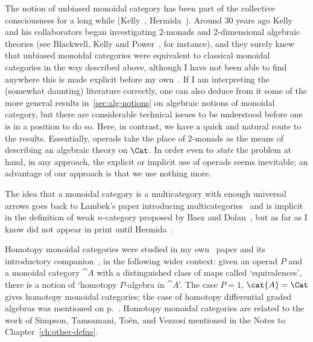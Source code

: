 \begin{notes}

The notion of unbiased monoidal category has been part of the collective
consciousness for a long while (Kelly~\cite{KelCD},
Hermida~\cite[9.1]{HerRM}).  Around 30 years ago Kelly%
%
%
and his
collaborators began investigating 2-monads and 2-dimensional%
%
%
algebraic
theories (see Blackwell, Kelly and Power~\cite{BKP}, for instance), and
they surely knew that unbiased monoidal categories were equivalent to
classical monoidal categories in the way described above, although I have
not been able to find anywhere this is made explicit before my
own~\cite{OHDCT}.  If I am interpreting the (somewhat daunting) literature
correctly, one can also deduce from it some of the more general results
in~\ref{sec:alg-notions} on algebraic notions of monoidal category, but
there are considerable technical issues to be understood before one is in a
position to do so.  Here, in contrast, we have a quick and natural route to
the results.  Essentially, operads take the place of 2-monads as the means
of describing an algebraic theory on $\Cat$.  In order even to \emph{state}
the problem at hand, in any approach, the explicit or implicit use of
operads seems inevitable; an advantage of our approach is that we use
nothing more.

The idea that a monoidal category is a multicategory with enough universal
arrows goes back to Lambek's paper introducing
multicategories~\cite{LamDSCII} and is implicit in the definition of weak
$n$-category proposed by Baez and Dolan~\cite{BDHDA3}, but as far as I know
did not appear in print until Hermida~\cite{HerRM}.%
%
%

Homotopy monoidal categories were studied in my own~\cite{HAO} paper and
its introductory companion~\cite{UTHM}, in the following wider context:
given an operad $P$ and a monoidal category $\cat{A}$ with a distinguished
class of maps called `equivalences', there is a notion of `homotopy%
%
%
%
%
$P$-algebra in $\cat{A}$'.  The case $P = 1$, $\cat{A} = \Cat$ gives
homotopy monoidal categories; the case of homotopy differential graded
algebras was mentioned on p.~\pageref{p:hty-dgas}.  Homotopy monoidal
categories are related to the work of Simpson,%
%
%
Tamsamani,%
%
%
To\"en,%
%
%
and
Vezzosi%
%
%
mentioned in the Notes to Chapter~\ref{ch:other-defns}.

\end{notes}
